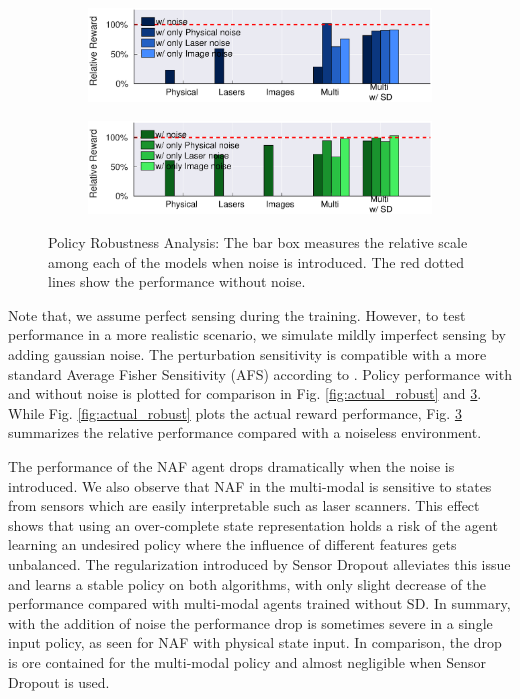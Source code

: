 \documentclass[../thesis.tex]{subfiles}
\begin{document}
\begin{figure}[t]
	\centering
	\begin{subfigure}[b]{0.48\linewidth}
		\includegraphics[width=\columnwidth,trim= 45 180 45 25, clip=true]{./MultimodalDRL/fig/relative_robust_naf}
		\label{fig:relative_robust_naf}
	\end{subfigure}
	\begin{subfigure}[b]{0.48\linewidth}
		\includegraphics[width=\columnwidth,trim= 45 180 45 25, clip=true]{./MultimodalDRL/fig/relative_robust_ddpg}
		\label{fig:relative_robust_ddpg}
	\end{subfigure}
	\caption{Policy Robustness Analysis: The bar box measures the relative scale among each of the models when noise is introduced. The red dotted lines show the performance without noise.}
    \label{fig:relative_robust}
\end{figure}

Note that, we assume perfect sensing during the training. However, to test performance in a more realistic scenario, we simulate mildly imperfect sensing by adding gaussian noise. The perturbation sensitivity is compatible with a more standard Average Fisher Sensitivity (AFS) according to \cite{progressive_net}. Policy performance with and without noise is plotted for comparison in Fig. \ref{fig:actual_robust} and \ref{fig:relative_robust}. While Fig. \ref{fig:actual_robust} plots the actual reward performance, Fig. \ref{fig:relative_robust} summarizes the relative performance compared with a noiseless environment. 

The performance of the NAF agent drops dramatically when the noise is introduced. We also observe that NAF in the multi-modal is sensitive to states from sensors which are easily interpretable such as laser scanners. This effect shows that using an over-complete state representation holds a risk of the agent learning an undesired policy where the influence of different features gets unbalanced. The regularization introduced by Sensor Dropout alleviates this issue and learns a stable policy on both algorithms, with only slight decrease of the performance compared with multi-modal agents trained without SD. In summary, with the addition of noise the performance drop is sometimes severe in a single input policy, as seen for NAF with physical state input. In comparison, the drop is ore contained for the multi-modal policy and almost negligible when Sensor Dropout is used.
\end{document}
